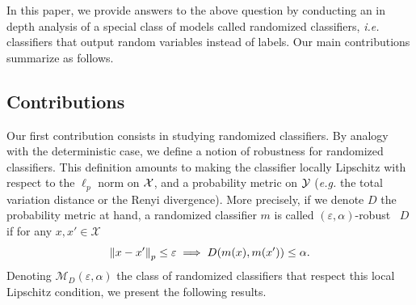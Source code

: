 In this paper, we provide answers to the above question by conducting an in depth analysis of a special class of models called randomized classifiers, \emph{i.e.} classifiers that output random variables instead of labels. Our main contributions summarize as follows. 

\subsection{Contributions}
\label{sec:contrib}

Our first contribution consists in studying randomized classifiers. By analogy with the deterministic case, we define a notion of robustness for randomized classifiers. This definition amounts to making the classifier locally Lipschitz with respect to the $\ell_p$ norm on $\mathcal{X}$, and a probability metric on $\mathcal{Y}$ (\emph{e.g.} the total variation distance or the Renyi divergence). More precisely, if we denote $D$ the probability metric at hand, a randomized classifier $m $ is called $(\varepsilon, \alpha)$-robust \wrt~$D$ if for any $x ,x ' \in \mathcal{X}$
$$ \norm{x  - x '}_p \leq \varepsilon \implies D(m (x ),m (x ')) \leq \alpha.$$
Denoting $\mathcal{M}_D(\varepsilon,\alpha)$ the class of randomized classifiers that respect this local Lipschitz condition, we present the following results. 
